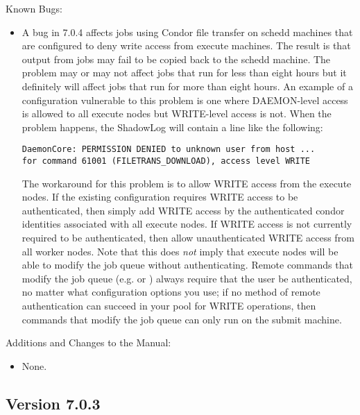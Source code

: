 \noindent Known Bugs:

\begin{itemize}

\item A bug in 7.0.4 affects jobs using Condor file transfer on schedd
machines that are configured to deny write access from execute
machines.  The result is that output from jobs may fail to be copied
back to the schedd machine.  The problem may or may not affect jobs
that run for less than eight hours but it definitely will affect jobs
that run for more than eight hours.  An example of a configuration
vulnerable to this problem is one where DAEMON-level access is allowed
to all execute nodes but WRITE-level access is not.  When the problem
happens, the ShadowLog will contain a line like the following:

\begin{verbatim}
DaemonCore: PERMISSION DENIED to unknown user from host ...
for command 61001 (FILETRANS_DOWNLOAD), access level WRITE
\end{verbatim}

The workaround for this problem is to allow WRITE access from the
execute nodes.  If the existing configuration requires WRITE access to
be authenticated, then simply add WRITE access by the authenticated
condor identities associated with all execute nodes.  If WRITE access
is not currently required to be authenticated, then allow
unauthenticated WRITE access from all worker nodes.  Note that this
does \emph{not} imply that execute nodes will be able to modify the
job queue without authenticating.  Remote commands that modify the job
queue (e.g.  or ) always require that the
user be authenticated, no matter what configuration options you use;
if no method of remote authentication can succeed in your pool for
WRITE operations, then commands that modify the job queue can only run
on the submit machine.

\end{itemize}

\noindent Additions and Changes to the Manual:

\begin{itemize}

\item None.

\end{itemize}

\subsection*{\label{sec:New-7-0-3}Version 7.0.3}

